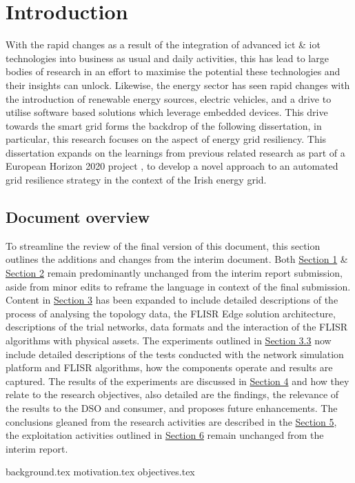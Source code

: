 \section{Introduction}
\label{sec:introduction}

With the rapid changes as a result of the integration of advanced \acs{ict} \& \acs{iot} technologies into business as usual and daily activities, this has lead to large bodies of research in an effort to maximise the
potential these technologies and their insights can unlock. Likewise, the energy sector has seen rapid changes with the introduction of renewable energy sources, electric vehicles, and a drive to utilise
software based solutions which leverage embedded devices. This drive towards the smart grid forms the backdrop of the following dissertation, in particular, this research focuses on the aspect of energy grid resiliency.
This dissertation expands on the learnings from previous related research as part of a European Horizon 2020 project \cite{10.12688/openreseurope.14115.2}, to develop a novel approach to an automated grid resilience strategy in the context of the Irish energy grid.

\subsection{Document overview}
\label{sec:overview}

\noindent To streamline the review of the final version of this document, this section outlines the additions and changes from the interim document.
Both \hyperref[sec:introduction]{Section 1} \& \hyperref[sec:literature]{Section 2} remain predominantly unchanged from the interim report submission, aside from minor edits
to reframe the language in context of the final submission. Content in \hyperref[sec:methods]{Section 3} has been expanded to include detailed descriptions of the process of analysing the
topology data, the FLISR Edge solution architecture, descriptions of the trial networks, data formats and the interaction of the FLISR algorithms with physical assets. The experiments outlined
in \hyperref[sec:experiments]{Section 3.3} now include detailed descriptions of the tests conducted with the network simulation platform and FLISR algorithms, how the components operate and results
are captured. The results of the experiments are discussed in \hyperref[sec:results]{Section 4} and how they relate to the research objectives, also detailed are the findings, the relevance
of the results to the DSO and consumer, and proposes future enhancements. The conclusions gleaned from the research activities are described in the \hyperref[sec:conclusion]{Section 5}, the
exploitation activities outlined in \hyperref[sec:exploitation]{Section 6} remain unchanged from the interim report.


{background.tex}
{motivation.tex}
{objectives.tex}


